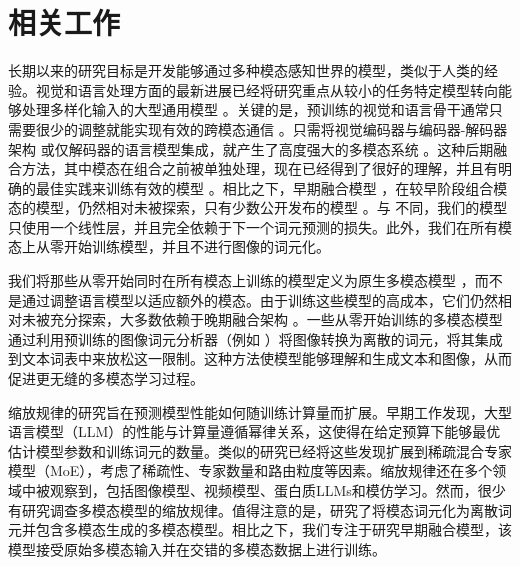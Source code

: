 \section{相关工作}


 长期以来的研究目标是开发能够通过多种模态感知世界的模型，类似于人类的经验。视觉和语言处理方面的最新进展已经将研究重点从较小的任务特定模型转向能够处理多样化输入的大型通用模型 \citep{team2023gemini,hurst2024gpt4o}。关键的是，预训练的视觉和语言骨干通常只需要很少的调整就能实现有效的跨模态通信 \citep{tsimpoukelli2021multimodalfrozen,shukor2023epalm,vallaeys2024improveddepalm,merullo2023linearly,koh2023grounding}。只需将视觉编码器与编码器-解码器架构 \citep{shukor2023unival,wang2022ofa,lu2022unified,mizrahi20234m} 或仅解码器的语言模型集成，就产生了高度强大的多模态系统 \citep{laurenccon2024mattersidefics2,alayrac2022flamingo,liu2024improvedllava,wang2024qwen2,xue2024xgenblip3,chen2024internvl,zhu2024minigpt,abdin2024phi3,dai2024nvlm,beyer2024paligemma,moon2024anymal}。这种后期融合方法，其中模态在组合之前被单独处理，现在已经得到了很好的理解，并且有明确的最佳实践来训练有效的模型 \citep{laurenccon2024obelics,mckinzie2025mm1,zhang2024mm1_5,lin2024vila}。相比之下，早期融合模型 \citep{fuyu8b,team2024chameleon,diao2024unveiling}，在较早阶段组合模态的模型，仍然相对未被探索，只有少数公开发布的模型 \citep{fuyu8b,diao2024unveiling}。与 \citep{diao2024unveiling,team2024chameleon} 不同，我们的模型只使用一个线性层，并且完全依赖于下一个词元预测的损失。此外，我们在所有模态上从零开始训练模型，并且不进行图像的词元化。


 我们将那些从零开始同时在所有模态上训练的模型定义为原生多模态模型 \citep{team2023gemini}，而不是通过调整语言模型以适应额外的模态。由于训练这些模型的高成本，它们仍然相对未被充分探索，大多数依赖于晚期融合架构 \citep{kosmoshuang2023language,yu2022coca}。一些从零开始训练的多模态模型 \citep{aghajanyan2022cm3,team2024chameleon,wang2024emu3} 通过利用预训练的图像词元分析器（例如 \citep{vqgan,vqvae}）将图像转换为离散的词元，将其集成到文本词表中来放松这一限制。这种方法使模型能够理解和生成文本和图像，从而促进更无缝的多模态学习过程。

 缩放规律的研究旨在预测模型性能如何随训练计算量而扩展。早期工作\citep{kaplan2020scaling,hoffmann2022training}发现，大型语言模型（LLM）的性能与计算量遵循幂律关系，这使得在给定预算下能够最优估计模型参数和训练词元的数量。类似的研究已经将这些发现扩展到稀疏混合专家模型（MoE），考虑了稀疏性、专家数量和路由粒度等因素\citep{krajewski2024scalingmoe,clark2022unifiedscalingmoe,wangscalingmoe}。缩放规律还在多个领域中被观察到，包括图像模型\citep{fini2024multimodalaimv2}、视频模型\citep{rajasegaran2025empirical}、蛋白质LLMs\citep{scalingprotein}和模仿学习\citep{pearce2024scaling}。然而，很少有研究调查多模态模型的缩放规律。值得注意的是，\citet{aghajanyan2023scalingmm}研究了将模态词元化为离散词元并包含多模态生成的多模态模型。相比之下，我们专注于研究早期融合模型，该模型接受原始多模态输入并在交错的多模态数据上进行训练。




